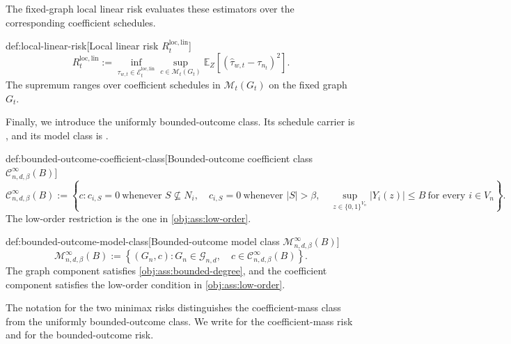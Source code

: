 The fixed-graph local linear risk  evaluates these estimators over the corresponding coefficient schedules.

\begin{definitionv}{def:local-linear-risk}[Local linear risk $R_t^{\mathrm{loc,lin}}$]
\[
R_t^{\mathrm{loc,lin}}
:=
\inf_{\widehat\tau_{w,t}\in\mathcal E_t^{\mathrm{loc,lin}}}
\sup_{c\in\mathcal M_t(G_t)}
\mathbb E_Z\!\left[
\left(\widehat\tau_{w,t}-\tau_{n_t}\right)^2
\right].
\]
The supremum ranges over coefficient schedules in \(\mathcal M_t(G_t)\) on the fixed graph \(G_t\).
\end{definitionv}

Finally, we introduce the uniformly bounded-outcome class. Its schedule carrier is , and its model class is .

\begin{definitionv}{def:bounded-outcome-coefficient-class}[Bounded-outcome coefficient class $\mathcal C_{n,d,\beta}^{\infty}(B)$]
\[
\mathcal C_{n,d,\beta}^{\infty}(B)
:=
\left\{
c:
 c_{i,S}=0\ \text{whenever } S\not\subseteq N_i,\quad
 c_{i,S}=0\ \text{whenever } |S|>\beta,\quad
\sup_{z\in\{0,1\}^{V_n}} |Y_i(z)|\le B\ \text{for every } i\in V_n
\right\}.
\]
The low-order restriction is the one in \cref{obj:ass:low-order}.
\end{definitionv}

\begin{definitionv}{def:bounded-outcome-model-class}[Bounded-outcome model class $\mathcal M_{n,d,\beta}^{\infty}(B)$]
\[
\mathcal M_{n,d,\beta}^{\infty}(B)
:=
\left\{
(G_n,c):
G_n\in\mathcal G_{n,d},\quad
c\in\mathcal C_{n,d,\beta}^{\infty}(B)
\right\}.
\]
The graph component satisfies \cref{obj:ass:bounded-degree}, and the coefficient component satisfies the low-order condition in \cref{obj:ass:low-order}.
\end{definitionv}

The notation for the two minimax risks distinguishes the coefficient-mass class from the uniformly bounded-outcome class. We write  for the coefficient-mass risk and  for the bounded-outcome risk.

